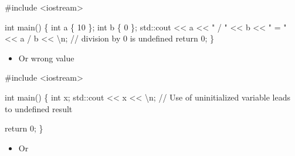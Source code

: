 \documentclass[
  letterpaper,
  DIV=11,
  numbers=noendperiod]{scrreprt}
\newenvironment{Shaded}{\begin{snugshade}}{\end{snugshade}}
\newcommand{\CommentTok}[1]{\textcolor[rgb]{0.37,0.37,0.37}{#1}}
\newcommand{\DecValTok}[1]{\textcolor[rgb]{0.68,0.00,0.00}{#1}}
\newcommand{\ErrorTok}[1]{\textcolor[rgb]{0.68,0.00,0.00}{#1}}
\newcommand{\FunctionTok}[1]{\textcolor[rgb]{0.28,0.35,0.67}{#1}}
\newcommand{\NormalTok}[1]{\textcolor[rgb]{0.00,0.23,0.31}{#1}}
\newcommand{\SpecialCharTok}[1]{\textcolor[rgb]{0.37,0.37,0.37}{#1}}
\newcommand{\StringTok}[1]{\textcolor[rgb]{0.13,0.47,0.30}{#1}}
\providecommand{\tightlist}{%
  \setlength{\itemsep}{0pt}\setlength{\parskip}{0pt}}\usepackage{longtable,booktabs,array}
\begin{document}
\begin{Shaded}
\begin{Highlighting}[]
\CommentTok{\#include \textless{}iostream\textgreater{}}

\NormalTok{int }\FunctionTok{main}\NormalTok{()}
\NormalTok{\{}
\NormalTok{    int a \{ }\DecValTok{10}\NormalTok{ \};}
\NormalTok{    int b \{ }\DecValTok{0}\NormalTok{ \};}
\NormalTok{    std}\SpecialCharTok{::}\NormalTok{cout }\SpecialCharTok{\textless{}}\ErrorTok{\textless{}}\NormalTok{ a }\SpecialCharTok{\textless{}}\ErrorTok{\textless{}} \StringTok{" / "} \SpecialCharTok{\textless{}}\ErrorTok{\textless{}}\NormalTok{ b }\SpecialCharTok{\textless{}}\ErrorTok{\textless{}} \StringTok{" = "} \SpecialCharTok{\textless{}}\ErrorTok{\textless{}}\NormalTok{ a }\SpecialCharTok{/}\NormalTok{ b }\SpecialCharTok{\textless{}}\ErrorTok{\textless{}} \StringTok{\textquotesingle{}}\SpecialCharTok{\textbackslash{}n}\StringTok{\textquotesingle{}}\NormalTok{; }\SpecialCharTok{/}\ErrorTok{/}\NormalTok{ division by }\DecValTok{0}\NormalTok{ is undefined}
\NormalTok{    return }\DecValTok{0}\NormalTok{;}
\NormalTok{\}}
\end{Highlighting}
\end{Shaded}

\begin{itemize}
\tightlist
\item
  Or wrong value
\end{itemize}

\begin{Shaded}
\begin{Highlighting}[]
\CommentTok{\#include \textless{}iostream\textgreater{}}

\NormalTok{int }\FunctionTok{main}\NormalTok{()}
\NormalTok{\{}
\NormalTok{    int x;}
\NormalTok{    std}\SpecialCharTok{::}\NormalTok{cout }\SpecialCharTok{\textless{}}\ErrorTok{\textless{}}\NormalTok{ x }\SpecialCharTok{\textless{}}\ErrorTok{\textless{}} \StringTok{\textquotesingle{}}\SpecialCharTok{\textbackslash{}n}\StringTok{\textquotesingle{}}\NormalTok{; }\SpecialCharTok{/}\ErrorTok{/}\NormalTok{ Use of uninitialized variable leads to undefined result}

\NormalTok{    return }\DecValTok{0}\NormalTok{;}
\NormalTok{\}}
\end{Highlighting}
\end{Shaded}

\begin{itemize}
\tightlist
\item
  Or
\end{itemize}
\end{document}
